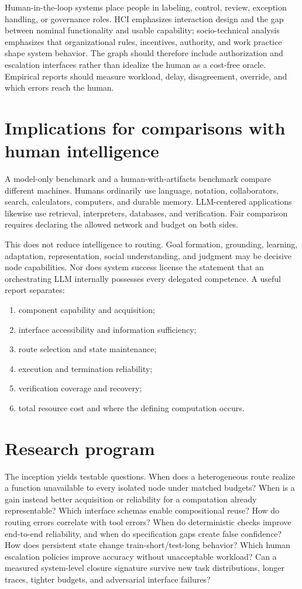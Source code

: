 \documentclass[10pt]{article}
\begin{document}
Human-in-the-loop systems place people in labeling, control, review, exception handling, or governance roles. HCI emphasizes interaction design and the gap between nominal functionality and usable capability; socio-technical analysis emphasizes that organizational rules, incentives, authority, and work practice shape system behavior. The graph should therefore include authorization and escalation interfaces rather than idealize the human as a cost-free oracle. Empirical reports should measure workload, delay, disagreement, override, and which errors reach the human.

\section{Implications for comparisons with human intelligence}

A model-only benchmark and a human-with-artifacts benchmark compare different machines. Humans ordinarily use language, notation, collaborators, search, calculators, computers, and durable memory. LLM-centered applications likewise use retrieval, interpreters, databases, and verification. Fair comparison requires declaring the allowed network and budget on both sides.

This does not reduce intelligence to routing. Goal formation, grounding, learning, adaptation, representation, social understanding, and judgment may be decisive node capabilities. Nor does system success license the statement that an orchestrating LLM internally possesses every delegated competence. A useful report separates:
\begin{enumerate}
  \item component capability and acquisition;
  \item interface accessibility and information sufficiency;
  \item route selection and state maintenance;
  \item execution and termination reliability;
  \item verification coverage and recovery;
  \item total resource cost and where the defining computation occurs.
\end{enumerate}

\section{Research program}

The inception yields testable questions. When does a heterogeneous route realize a function unavailable to every isolated node under matched budgets? When is a gain instead better acquisition or reliability for a computation already representable? Which interface schemas enable compositional reuse? How do routing errors correlate with tool errors? When do deterministic checks improve end-to-end reliability, and when do specification gaps create false confidence? How does persistent state change train-short/test-long behavior? Which human escalation policies improve accuracy without unacceptable workload? Can a measured system-level closure signature survive new task distributions, longer traces, tighter budgets, and adversarial interface failures?
\end{document}
